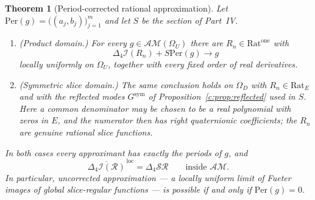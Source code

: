 \documentclass[11pt,a4paper]{article}
\numberwithin{equation}{section}
\newtheorem{theorem}{Theorem}[section]
\theoremstyle{definition}
\theoremstyle{remark}
\theoremstyle{plain}
\newcommand{\lap}{\Delta_4}
\newcommand{\I}{\mathcal I}
\newcommand{\SR}{\mathcal{SR}}
\newcommand{\AM}{\mathcal{AM}}
\newcommand{\Om}{\Omega}
\newcommand{\Per}{\mathrm{Per}}
\begin{document}
\begin{theorem}[Period-corrected rational approximation]
\label{d:thm:runge}
Let $\Per(g)=\bigl((a_j,b_j)\bigr)_{j=1}^m$ and let $S$ be the section of
Part~IV.
\begin{enumerate}[label=\textup{(\roman*)}]
\item \textup{(Product domain.)}  For every $g\in\AM(\Om_U)$ there are
$R_n\in\mathrm{Rat}^{\mathrm{one}}$ with
\begin{equation}
 \lap\I(R_n)+S\Per(g)\longrightarrow g
 \label{d:eq:runge}
\end{equation}
locally uniformly on $\Om_U$, together with every fixed order of real
derivatives.
\item \textup{(Symmetric slice domain.)}  The same conclusion holds on
$\Om_D$ with $R_n\in\mathrm{Rat}_E$ and with the reflected modes
$G^{\mathrm{sym}}$ of Proposition~\ref{c:prop:reflected} used in $S$.  Here a common denominator may be
chosen to be a \emph{real} polynomial with zeros in $E$, and the numerator
then has right quaternionic coefficients; the $R_n$ are genuine rational
slice functions.
\end{enumerate}
In both cases every approximant has \emph{exactly} the periods of $g$, and
\[
 \overline{\lap\I(\mathcal R)}^{\,\mathrm{loc}}=\lap\SR
 \qquad\text{inside }\AM .
\]
In particular, uncorrected approximation --- a locally uniform limit of
Fueter images of global slice-regular functions --- is possible if and only
if $\Per(g)=0$.
\end{theorem}
\end{document}
